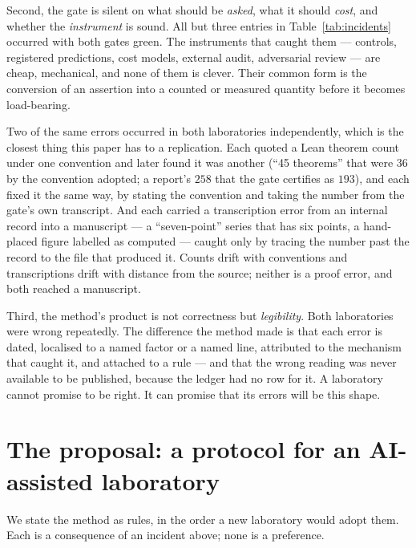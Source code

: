 \documentclass[11pt]{article}
\begin{document}
Second, the gate is silent on what should be \emph{asked}, what it should \emph{cost}, and
whether the \emph{instrument} is sound. All but three entries in Table~\ref{tab:incidents}
occurred with both gates green. The instruments that caught them --- controls, registered predictions, cost
models, external audit, adversarial review --- are cheap, mechanical, and none of them is
clever. Their common form is the conversion of an assertion into a counted or measured
quantity before it becomes load-bearing.

Two of the same errors occurred in both laboratories independently, which is the closest thing
this paper has to a replication. Each quoted a Lean theorem count under one convention and
later found it was another (``45 theorems'' that were $36$ by the convention adopted; a
report's $258$ that the gate certifies as $193$), and each fixed it the same way, by stating
the convention and taking the number from the gate's own transcript. And each carried a
transcription error from an internal record into a manuscript --- a ``seven-point'' series
that has six points, a hand-placed figure labelled as computed --- caught only by tracing the
number past the record to the file that produced it. Counts drift with conventions and
transcriptions drift with distance from the source; neither is a proof error, and both reached
a manuscript.

Third, the method's product is not correctness but \emph{legibility}. Both laboratories were
wrong repeatedly. The difference the method made is that each error is dated, localised to a
named factor or a named line, attributed to the mechanism that caught it, and attached to a
rule --- and that the wrong reading was never available to be published, because the ledger
had no row for it. A laboratory cannot promise to be right. It can promise that its errors will
be this shape.

\section{The proposal: a protocol for an AI-assisted laboratory}
\label{sec:protocol}

We state the method as rules, in the order a new laboratory would adopt them. Each is a
consequence of an incident above; none is a preference.
\end{document}
